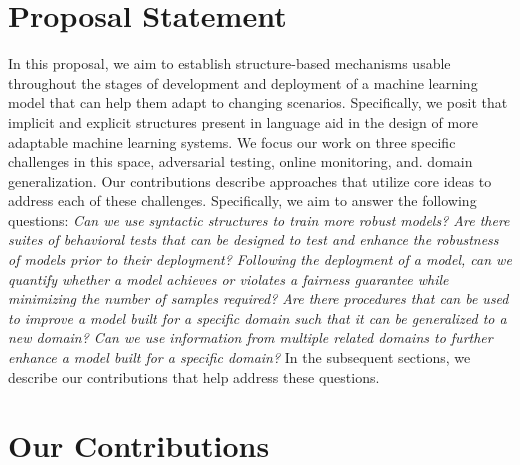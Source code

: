 \section{Proposal Statement}
In this proposal, we aim to establish structure-based mechanisms usable throughout the stages of development and deployment of a machine learning model that can help them adapt to changing scenarios. 
Specifically, we posit that implicit and explicit structures present in language aid in the design of more adaptable machine learning systems.
We focus our work on three specific challenges in this space, adversarial testing, online monitoring, and. domain generalization.
Our contributions describe approaches that utilize core ideas to address each of these challenges.
Specifically, we aim to answer the following questions: 
\textit{Can we use syntactic structures to train more robust models?
Are there suites of behavioral tests that can be designed to test and enhance the robustness of models prior to their deployment?
Following the deployment of a model, can we quantify whether a model achieves or violates a fairness guarantee while minimizing the number of samples required?
Are there procedures that can be used to improve a model built for a specific domain such that it can be generalized to a new domain?
Can we use information from multiple related domains to further enhance a model built for a specific domain?}
In the subsequent sections, we describe our contributions that help address these questions.

\section{Our Contributions}

